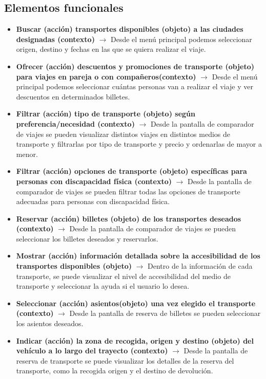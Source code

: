 \subsection{Elementos funcionales}
\begin{itemize}
    \item \textbf{Buscar (acción) transportes disponibles (objeto) a las ciudades designadas (contexto)} $\rightarrow$ Desde el menú principal podemos 
    seleccionar origen, destino y fechas en las que se quiera realizar el viaje.
    \item \textbf{Ofrecer (acción) descuentos y promociones de transporte (objeto) para viajes en pareja o con compañeros(contexto)} $\rightarrow$ Desde el menú 
    principal podemos seleccionar cuántas personas van a realizar el viaje y ver descuentos en determinados billetes.
    \item \textbf{Filtrar (acción) tipo de transporte (objeto) según preferencia/necesidad (contexto)} $\rightarrow$ Desde la pantalla de comparador de viajes 
    se pueden visualizar distintos viajes en distintos medios de transporte y filtrarlas por tipo de transporte y precio y ordenarlas de mayor a menor.
    \item \textbf{Filtrar (acción) opciones de transporte (objeto) específicas para personas con discapacidad física (contexto)} $\rightarrow$ Desde la pantalla 
    de comparador de viajes se pueden filtrar todas las opciones de transporte adecuadas para personas con discapacidad física.
    \item \textbf{Reservar (acción) billetes (objeto) de los transportes deseados (contexto)} $\rightarrow$ Desde la pantalla de comparador de viajes se pueden 
    seleccionar los billetes deseados y reservarlos.
    \item \textbf{Mostrar (acción) información detallada sobre la accesibilidad de los transportes disponibles (objeto)} $\rightarrow$ Dentro de la información 
    de cada transporte, se puede visualizar el nivel de accesibilidad del medio de transporte y seleccionar la ayuda si el usuario lo desea.
    \item \textbf{Seleccionar (acción) asientos(objeto) una vez elegido el transporte (contexto)} $\rightarrow$ Desde la pantalla de reserva de billetes se 
    pueden seleccionar los asientos deseados.
    \item \textbf{Indicar (acción) la zona de recogida, origen y destino (objeto) del vehículo a lo largo del trayecto (contexto)} $\rightarrow$ Desde la pantalla 
    de reserva de transporte se puede visualizar los detalles de la reserva del transporte, como la recogida origen y el destino de devolución.

\end{itemize}
